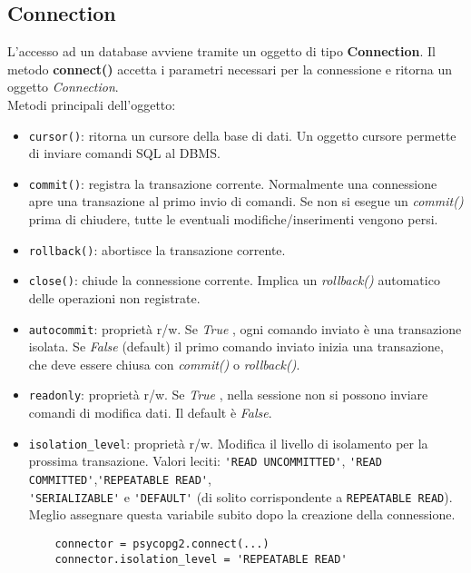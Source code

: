 \documentclass[a4paper, 10pt, titlepage]{article}
\begin{document}
	\subsection{Connection}
	L'accesso ad un database avviene tramite un oggetto di tipo \textbf{Connection}. Il metodo \textbf{connect()} accetta i parametri necessari per la connessione e ritorna un oggetto \textit{Connection}.\\
	Metodi principali dell'oggetto:
	\begin{itemize}
	\item \lstinline|cursor()|: ritorna un cursore della base di dati. Un oggetto cursore permette di inviare comandi SQL al DBMS.
	\item \lstinline[keywordstyle=\color{black}]|commit()|: registra la transazione corrente. Normalmente una connessione apre una transazione al primo invio di comandi. Se non si esegue un \textit{commit()} prima di chiudere, tutte le eventuali modifiche/inserimenti vengono persi.
	\item \lstinline[keywordstyle=\color{black}]|rollback()|: abortisce la transazione corrente.
	\item \lstinline|close()|: chiude la connessione corrente. Implica un \textit{rollback()} automatico delle operazioni non registrate.
	\item \lstinline|autocommit|: proprietà r/w. Se \textit{True} , ogni comando inviato è una transazione isolata. Se \textit{False} (default) il primo comando inviato inizia una transazione, che deve essere chiusa con \textit{commit()} o \textit{rollback()}.
	\item \lstinline|readonly|: proprietà r/w. Se \textit{True} , nella sessione non si possono inviare comandi di modifica dati. Il default è \textit{False}.
	\item \lstinline|isolation_level|: proprietà r/w. Modifica il livello di isolamento per la prossima transazione. Valori leciti: \lstinline|'READ UNCOMMITTED'|, \lstinline|'READ COMMITTED'|,\lstinline|'REPEATABLE READ'|, \\ \lstinline|'SERIALIZABLE'| e  \lstinline|'DEFAULT'| (di solito corrispondente a \lstinline[keywordstyle=\color{black}]|REPEATABLE READ|). \\
 Meglio assegnare questa variabile subito dopo la creazione della connessione.
	\begin{lstlisting}
	connector = psycopg2.connect(...)
	connector.isolation_level = 'REPEATABLE READ'
	\end{lstlisting}
	\end{itemize}
	
\end{document}
